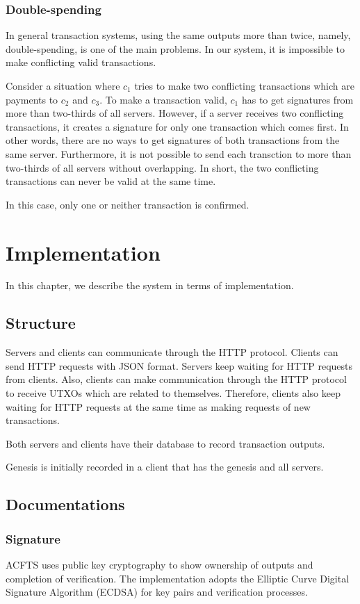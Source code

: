 \documentclass[a4paper, oneside]{discothesis}
\begin{document}
\subsection{Double-spending}
In general transaction systems, using the same outputs more than twice,
namely, double-spending, is one of the main problems.
In our system, it is impossible to make conflicting valid transactions.

Consider a situation where $c_1$ tries to make two conflicting transactions
which are payments to $c_2$ and $c_3$.
To make a transaction valid, $c_1$ has to get signatures
from more than two-thirds of all servers.
However, if a server receives two conflicting transactions, it creates a signature for only one
transaction which comes first.
In other words, there are no ways to get signatures of both transactions from the same server.
Furthermore, it is not possible to send each transction to more than two-thirds of all servers
without overlapping.
In short, the two conflicting transactions can never be valid at the same time.

In this case, only one or neither transaction is confirmed.


\chapter{Implementation}
In this chapter, we describe the system in terms of implementation.

\section{Structure}
Servers and clients can communicate through the HTTP protocol.
Clients can send HTTP requests with JSON format.
Servers keep waiting for HTTP requests from clients.
Also, clients can make communication through the HTTP protocol
to receive UTXOs which are related to themselves.
Therefore, clients also keep waiting for HTTP requests at the same time
as making requests of new transactions.

Both servers and clients have their database to record transaction outputs.

Genesis is initially recorded in a client that has the genesis and all servers.

\section{Documentations}

\subsection{Signature}
ACFTS uses public key cryptography to show ownership of outputs and completion of verification.
The implementation adopts the Elliptic Curve Digital Signature Algorithm (ECDSA)
for key pairs and verification processes.
\end{document}
